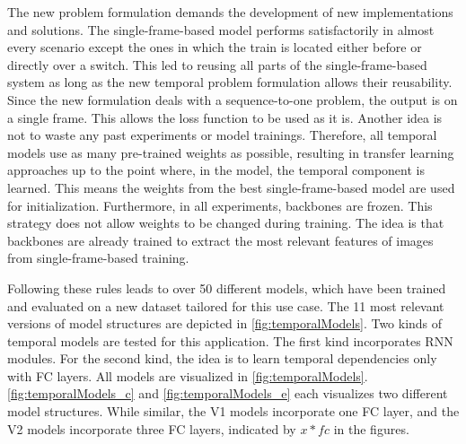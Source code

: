 \noindent The new problem formulation demands the development of new implementations and solutions.
The single-frame-based model performs satisfactorily in almost every scenario except the ones in which the train is located either before or directly over a switch.
This led to reusing all parts of the single-frame-based system as long as the new temporal problem formulation allows their reusability.
Since the new formulation deals with a sequence-to-one problem, the output is on a single frame. This allows the loss function to be used as it is.
Another idea is not to waste any past experiments or model trainings.
Therefore, all temporal models use as many pre-trained weights as possible, resulting in transfer learning approaches up to the point where, in the model, the temporal component is learned.
This means the weights from the best single-frame-based model are used for initialization.
Furthermore, in all experiments, backbones are frozen.
This strategy does not allow weights to be changed during training.
The idea is that backbones are already trained to extract the most relevant features of images from single-frame-based training.

Following these rules leads to over 50 different models, which have been trained and evaluated on a new dataset tailored for this use case.
The 11 most relevant versions of model structures are depicted in \autoref{fig:temporalModels}.
Two kinds of temporal models are tested for this application.
The first kind incorporates \ac{RNN} modules.
For the second kind, the idea is to learn temporal dependencies only with \ac{FC} layers.
All models are visualized in \autoref{fig:temporalModels}.
\autoref{fig:temporalModels_c} and \autoref{fig:temporalModels_e} each visualizes two different model structures.
While similar, the V1 models incorporate one \ac{FC} layer, and the V2 models incorporate three \ac{FC} layers, indicated by $x * fc$ in the figures.

